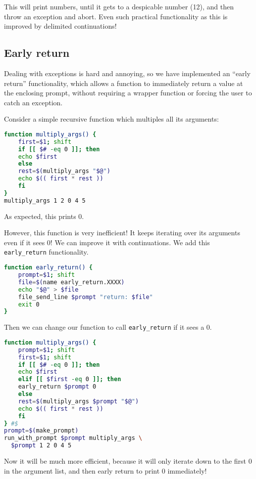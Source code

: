 \documentclass[sigplan]{acmart}
\begin{document}
This will print numbers, until it gets to a despicable number (12),
and then throw an exception and abort.
Even such practical functionality as this is improved by delimited continuations!

\subsection{Early return}

Dealing with exceptions is hard and annoying,
so we have implemented an ``early return'' functionality,
which allows a function to immediately return a value at the enclosing prompt,
without requiring a wrapper function or forcing the user to catch an exception.

Consider a simple recursive function which multiples all its arguments:

\begin{lstlisting}[language=bash]
function multiply_args() {
    first=$1; shift
    if [[ $# -eq 0 ]]; then
	echo $first
    else
	rest=$(multiply_args "$@")
	echo $(( first * rest ))
    fi
}
multiply_args 1 2 0 4 5
\end{lstlisting}

As expected, this prints 0.

However, this function is very inefficient! It keeps iterating over its arguments even if it sees 0!
We can improve it with continuations.
We add this \texttt{early\_return} functionality.

\begin{lstlisting}[language=bash]
function early_return() {
    prompt=$1; shift
    file=$(name early_return.XXXX)
    echo "$@" > $file
    file_send_line $prompt "return: $file"
    exit 0
}
\end{lstlisting}

Then we can change our function to call \texttt{early\_return} if it sees a 0.

\begin{lstlisting}[language=bash]
function multiply_args() {
    prompt=$1; shift
    first=$1; shift
    if [[ $# -eq 0 ]]; then
	echo $first
    elif [[ $first -eq 0 ]]; then
	early_return $prompt 0
    else
	rest=$(multiply_args $prompt "$@")
	echo $(( first * rest ))
    fi
} #$
prompt=$(make_prompt)
run_with_prompt $prompt multiply_args \
  $prompt 1 2 0 4 5
\end{lstlisting}

Now it will be much more efficient, because it will only iterate down to the first 0 in the argument list,
and then early return to print 0 immediately!
\end{document}
